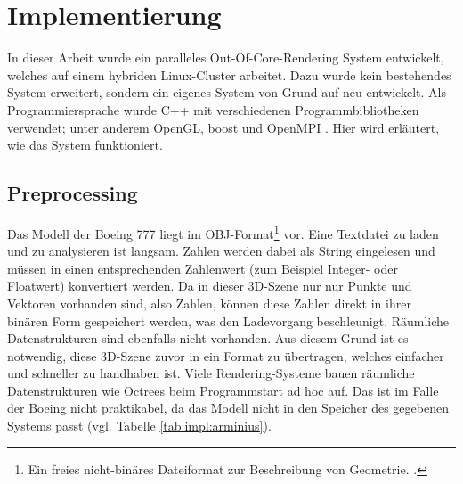 
\chapter{Implementierung}
\label{chap:impl}
%
%

In dieser Arbeit wurde ein paralleles Out-Of-Core-Rendering System entwickelt, welches auf einem hybriden Linux-Cluster arbeitet. Dazu wurde kein bestehendes System erweitert, sondern ein eigenes System von Grund auf neu entwickelt. Als Programmiersprache wurde C++ mit verschiedenen Programmbibliotheken verwendet; unter anderem OpenGL, boost und OpenMPI \cite{mpi}. Hier wird erläutert, wie das System funktioniert.\\

\section{Preprocessing}
\label{sec:impl:preprocessing}
Das Modell der Boeing 777 liegt im OBJ-Format\footnote{Ein freies nicht-binäres Dateiformat zur Beschreibung von Geometrie. \cite{obj}. } vor. Eine Textdatei zu laden und zu analysieren ist langsam. Zahlen werden dabei als String eingelesen und müssen in einen entsprechenden Zahlenwert (zum Beispiel Integer- oder Floatwert) konvertiert werden. Da in dieser 3D-Szene nur nur Punkte und Vektoren vorhanden sind, also Zahlen, können diese Zahlen direkt in ihrer binären Form gespeichert werden, was den Ladevorgang beschleunigt. Räumliche Datenstrukturen sind ebenfalls nicht vorhanden. Aus diesem Grund ist es notwendig, diese 3D-Szene zuvor in ein Format zu übertragen, welches einfacher und schneller zu handhaben ist. Viele Rendering-Systeme bauen räumliche Datenstrukturen wie Octrees beim Programmstart ad hoc auf. Das ist im Falle der Boeing nicht praktikabel, da das Modell nicht in den Speicher des gegebenen Systems passt (vgl. Tabelle \ref{tab:impl:arminius}).

